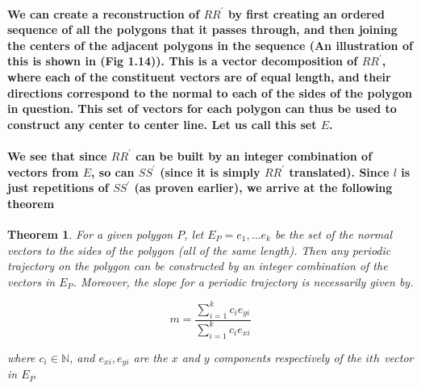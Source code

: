 \documentclass{report}
\newtheorem{theorem}{Theorem}[chapter]
\begin{document}
\pagebreak

\paragraph{We can create a reconstruction of $RR^\prime$ by first creating an ordered sequence of all the polygons that it passes through, and then joining the centers of the adjacent polygons in the sequence (An illustration of this is shown in (Fig 1.14)). This is a vector decomposition of $RR^\prime$, where each of the constituent vectors are of equal length, and their directions correspond to the normal to each of the sides of the polygon in question. This set of vectors for each polygon can thus be used to construct any center to center line. Let us call this set $E$.}


\paragraph{We see that since $RR^\prime$ can be built by an integer combination of vectors from $E$, so can $SS^\prime$ (since it is simply $RR^\prime$ translated). Since $l$ is just repetitions of $SS^\prime$ (as proven earlier), we arrive at the following theorem}




\begin{theorem}
For a given polygon $P$, let $E_P = {e_1,...e_k}$ be the set of the normal vectors to the sides of the polygon (all of the same length). Then any periodic trajectory on the polygon can be constructed by an integer combination of the vectors in $E_P$. Moreover, the slope for a periodic trajectory is necessarily given by.

\begin{equation}
m=\frac{\sum_{i=1}^k  c_ie_{yi} }{\sum_{i=1}^k  c_ie_{xi} }  
\end{equation}

where $c_i \in \mathbb{N}$, and $e_{xi}, e_{yi}$ are the $x$ and $y$ components respectively of the $ith$ vector in $E_P$
\end{theorem}
\end{document}
